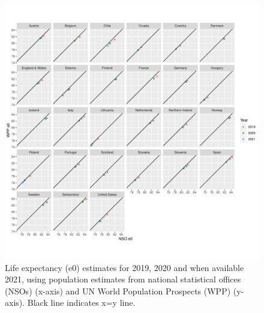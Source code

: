 \documentclass[12pt]{article}
\begin{document}
\begin{figure}[ht!]
    \centering
    \includegraphics{figure-a8.pdf}
    \caption{Life expectancy (e0) estimates for 2019, 2020 and when available 2021, using population estimates from national statistical offices (NSOs) (x-axis) and UN World Population Prospects (WPP) (y-axis). Black line indicates x=y line.}
    \label{fig:figure-a8}
\end{figure}

\clearpage
\end{document}
